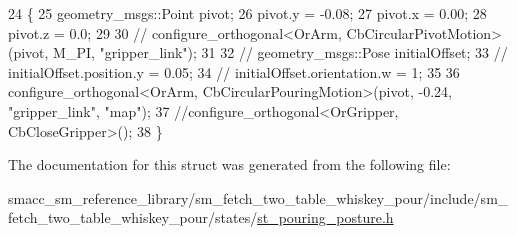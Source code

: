\begin{DoxyCode}
24         \{
25             geometry\_msgs::Point pivot;
26             pivot.y = -0.08;
27             pivot.x = 0.00;
28             pivot.z = 0.0;
29 
30             \textcolor{comment}{// configure\_orthogonal<OrArm, CbCircularPivotMotion>(pivot, M\_PI, "gripper\_link");}
31 
32             \textcolor{comment}{// geometry\_msgs::Pose initialOffset;}
33             \textcolor{comment}{// initialOffset.position.y = 0.05;}
34             \textcolor{comment}{// initialOffset.orientation.w = 1;}
35 
36             configure\_orthogonal<OrArm, CbCircularPouringMotion>(pivot, -0.24, \textcolor{stringliteral}{"gripper\_link"}, \textcolor{stringliteral}{"map"});
37             \textcolor{comment}{//configure\_orthogonal<OrGripper, CbCloseGripper>();}
38         \}
\end{DoxyCode}


The documentation for this struct was generated from the following file\+:\begin{DoxyCompactItemize}
\item 
smacc\+\_\+sm\+\_\+reference\+\_\+library/sm\+\_\+fetch\+\_\+two\+\_\+table\+\_\+whiskey\+\_\+pour/include/sm\+\_\+fetch\+\_\+two\+\_\+table\+\_\+whiskey\+\_\+pour/states/\hyperlink{st__pouring__posture_8h}{st\+\_\+pouring\+\_\+posture.\+h}\end{DoxyCompactItemize}
